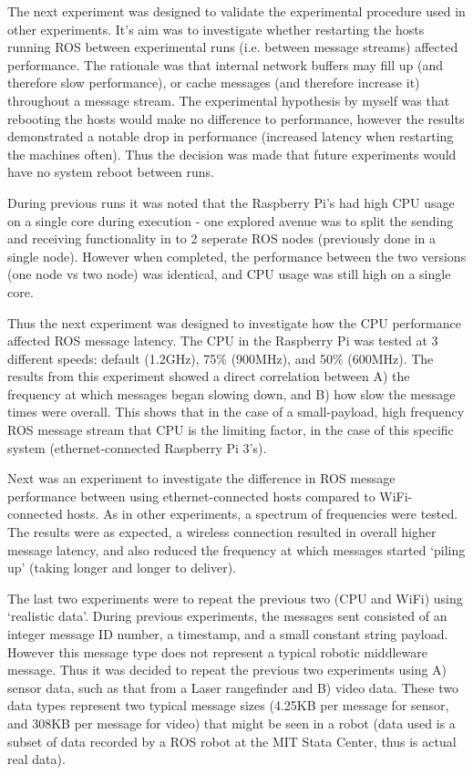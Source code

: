 \documentclass[11pt]{article}
\begin{document}
The next experiment was designed to validate the experimental procedure used in other experiments. It's aim was to investigate whether restarting the hosts running ROS between experimental runs (i.e. between message streams) affected performance. The rationale was that internal network buffers may fill up (and therefore slow performance), or cache messages (and therefore increase it) throughout a message stream. The experimental hypothesis by myself was that rebooting the hosts would make no difference to performance, however the results demonstrated a notable drop in performance (increased latency when restarting the machines often). Thus the decision was made that future experiments would have no system reboot between runs.

During previous runs it was noted that the Raspberry Pi's had high CPU usage on a single core during execution - one explored avenue was to split the sending and receiving functionality in to 2 seperate ROS nodes (previously done in a single node). However when completed, the performance between the two versions (one node vs two node) was identical, and CPU usage was still high on a single core.

Thus the next experiment was designed to investigate how the CPU performance affected ROS message latency. The CPU in the Raspberry Pi was tested at 3 different speeds: default (1.2GHz), 75\% (900MHz), and 50\% (600MHz). The results from this experiment showed a direct correlation between A) the frequency at which messages began slowing down, and B) how slow the message times were overall. This shows that in the case of a small-payload, high frequency ROS message stream that CPU is the limiting factor, in the case of this specific system (ethernet-connected Raspberry Pi 3's).

Next was an experiment to investigate the difference in ROS message performance between using ethernet-connected hosts compared to WiFi-connected hosts. As in other experiments, a spectrum of frequencies were tested. The results were as expected, a wireless connection resulted in overall higher message latency, and also reduced the frequency at which messages started `piling up' (taking longer and longer to deliver).

The last two experiments were to repeat the previous two (CPU and WiFi) using `realistic data'. During previous experiments, the messages sent consisted of an integer message ID number, a timestamp, and a small constant string payload. However this message type does not represent a typical robotic middleware message. Thus it was decided to repeat the previous two experiments using A) sensor data, such as that from a Laser rangefinder and B) video data. These two data types represent two typical message sizes (4.25KB per message for sensor, and 308KB per message for video) that might be seen in a robot (data used is a subset of data recorded by a ROS robot at the MIT Stata Center, thus is actual real data).
\end{document}
